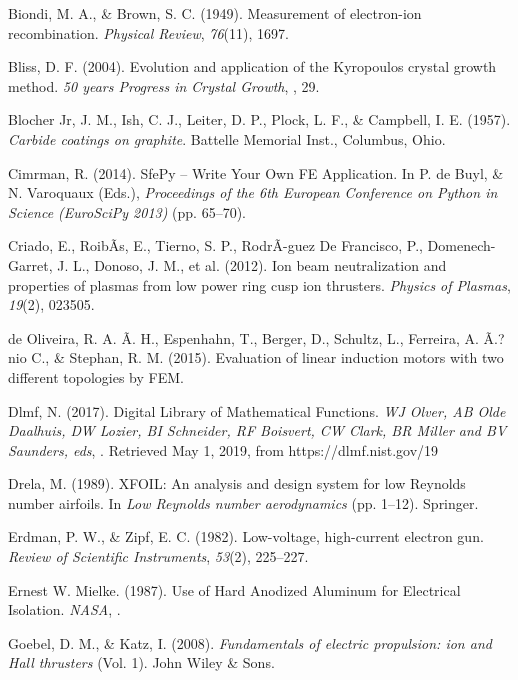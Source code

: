 \documentclass{article}
\begin{document}
\begin{thebibliography}{41}

 Biondi, M. A., \& Brown, S. C. (1949). Measurement of electron-ion recombination. \textit{Physical Review}, \textit{76}(11), 1697.

 Bliss, D. F. (2004). Evolution and application of the Kyropoulos crystal growth method. \textit{50 years Progress in Crystal Growth}, , 29.

 Blocher Jr, J. M., Ish, C. J., Leiter, D. P., Plock, L. F., \& Campbell, I. E. (1957). \textit{Carbide coatings on graphite}. Battelle Memorial Inst., Columbus, Ohio.

 Cimrman, R. (2014). SfePy -- Write Your Own FE Application. In P. de Buyl, \& N. Varoquaux (Eds.), \textit{Proceedings of the 6th European Conference on Python in Science (EuroSciPy 2013)} (pp. 65--70).

 Criado, E., Roib{\~A}{\textexclamdown}s, E., Tierno, S. P., Rodr{\~A}-guez De Francisco, P., Domenech-Garret, J. L., Donoso, J. M., et al. (2012). Ion beam neutralization and properties of plasmas from low power ring cusp ion thrusters. \textit{Physics of Plasmas}, \textit{19}(2), 023505.

 de Oliveira, R. A. {\~A}. {\textcopyright} H., Espenhahn, T., Berger, D., Schultz, L., Ferreira, A. {\~A}.?nio C., \& Stephan, R. M. (2015). Evaluation of linear induction motors with two different topologies by FEM.

 Dlmf, N. (2017). Digital Library of Mathematical Functions. \textit{WJ Olver, AB Olde Daalhuis, DW Lozier, BI Schneider, RF Boisvert, CW Clark, BR Miller and BV Saunders, eds}, . Retrieved May 1, 2019, from https://dlmf.nist.gov/19

 Drela, M. (1989). XFOIL: An analysis and design system for low Reynolds number airfoils. In \textit{Low Reynolds number aerodynamics} (pp. 1--12). Springer.

 Erdman, P. W., \& Zipf, E. C. (1982). Low-voltage, high-current electron gun. \textit{Review of Scientific Instruments}, \textit{53}(2), 225--227.

 Ernest W. Mielke. (1987). Use of Hard Anodized Aluminum for Electrical Isolation. \textit{NASA}, .

 Goebel, D. M., \& Katz, I. (2008). \textit{Fundamentals of electric propulsion: ion and Hall thrusters} (Vol. 1). John Wiley \& Sons.


\end{thebibliography}
\end{document}
